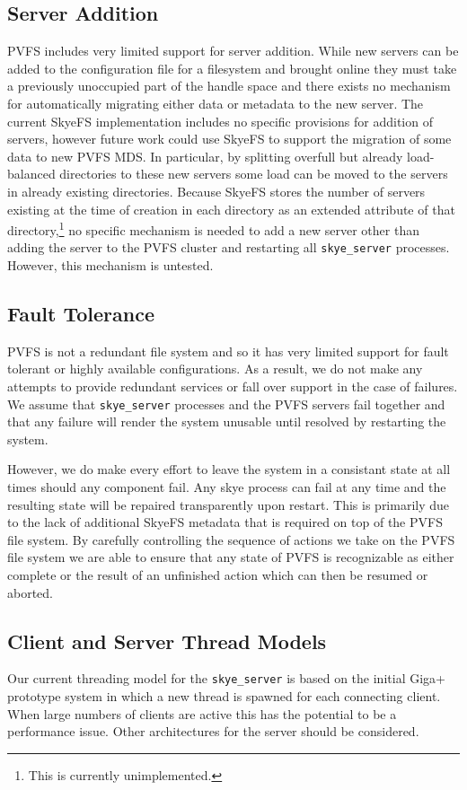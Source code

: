 \documentclass[letterpaper]{article}
\newcommand{\code}[1]{\texttt{#1}}
\begin{document}
\subsection{Server Addition}
PVFS includes very limited support for server addition.  While new servers can
be added to the configuration file for a filesystem and brought online they must
take a previously unoccupied part of the handle space and there exists no
mechanism for automatically migrating either data or metadata to the new server.
The current SkyeFS implementation includes no specific provisions for addition
of servers, however future work could use SkyeFS to support the migration of
some data to new PVFS MDS.  In particular, by splitting overfull but already
load-balanced directories to these new servers some load can be moved to the
servers in already existing directories.  Because SkyeFS stores the number of
servers existing at the time of creation in each directory as an extended
attribute of that directory,\footnote{This is currently unimplemented.} no
specific mechanism is needed to add a new server other than adding the server
to the PVFS cluster and restarting all \code{skye\_\-server} processes.  However,
this mechanism is untested.

\subsection{Fault Tolerance}
PVFS is not a redundant file system and so it has very limited support for fault
tolerant or highly available configurations.  As a result, we do not make any
attempts to provide redundant services or fall over support in the case of
failures.  We assume that \code{skye\_\-server} processes and the PVFS servers fail
together and that any failure will render the system unusable until resolved by
restarting the system.

However, we do make every effort to leave the system in a consistant state at
all times should any component fail.  Any skye process can fail at any time
and the resulting state will be repaired transparently upon restart.  This is
primarily due to the lack of additional SkyeFS metadata that is required on
top of the PVFS file system.  By carefully controlling the sequence of actions
we take on the PVFS file system we are able to ensure that any state of PVFS
is recognizable as either complete or the result of an unfinished action which
can then be resumed or aborted.

\subsection{Client and Server Thread Models}
Our current threading model for the \code{skye\_\-server} is based on the
initial Giga+ prototype system in which a new thread is spawned for each
connecting client.  When large numbers of clients are active this has the
potential to be a performance issue.  Other architectures for the server
should be considered. 
\end{document}
